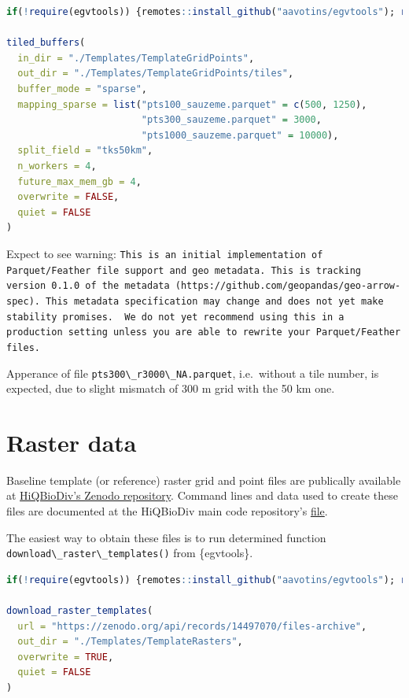 \documentclass[
]{book}
\newcommand{\passthrough}[1]{#1}
\begin{document}
\begin{lstlisting}[language=R]
if(!require(egvtools)) {remotes::install_github("aavotins/egvtools"); require(egvtools)}

tiled_buffers(
  in_dir = "./Templates/TemplateGridPoints",
  out_dir = "./Templates/TemplateGridPoints/tiles",
  buffer_mode = "sparse",
  mapping_sparse = list("pts100_sauzeme.parquet" = c(500, 1250), 
                        "pts300_sauzeme.parquet" = 3000, 
                        "pts1000_sauzeme.parquet" = 10000),
  split_field = "tks50km",
  n_workers = 4,
  future_max_mem_gb = 4,
  overwrite = FALSE,
  quiet = FALSE
)
\end{lstlisting}

Expect to see warning:
\passthrough{\lstinline!This is an initial implementation of Parquet/Feather file support and geo metadata. This is tracking version 0.1.0 of the metadata (https://github.com/geopandas/geo-arrow-spec). This metadata specification may change and does not yet make stability promises.  We do not yet recommend using this in a production setting unless you are able to rewrite your Parquet/Feather files.!}

Apperance of file \passthrough{\lstinline!pts300\_r3000\_NA.parquet!}, i.e.~without a tile number, is expected,
due to slight mismatch of 300 m grid with the 50 km one.

\section{Raster data}\label{Ch03.02}

Baseline template (or reference) raster grid and point files are publically available
at \href{https://zenodo.org/records/14497070}{HiQBioDiv's Zenodo repository}. Command lines
and data used to create these files are documented at
the HiQBioDiv main code repository's \href{https://github.com/aavotins/HiQBioDiv/blob/main/Templates/TemplateGrids_Raster.R}{file}.

The easiest way to obtain these files is to run determined
function \passthrough{\lstinline!download\_raster\_templates()!} from \{egvtools\}.

\begin{lstlisting}[language=R]
if(!require(egvtools)) {remotes::install_github("aavotins/egvtools"); require(egvtools)}

download_raster_templates(
  url = "https://zenodo.org/api/records/14497070/files-archive",
  out_dir = "./Templates/TemplateRasters",
  overwrite = TRUE,
  quiet = FALSE
)
\end{lstlisting}
\end{document}
